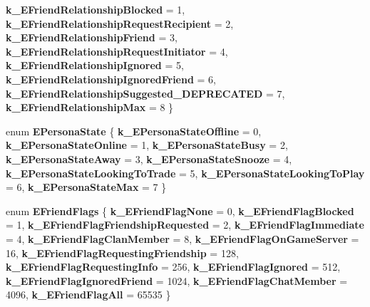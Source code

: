 \begin{DoxyCompactItemize}
{\bfseries k\+\_\+\+E\+Friend\+Relationship\+Blocked} = 1, 
{\bfseries k\+\_\+\+E\+Friend\+Relationship\+Request\+Recipient} = 2, 
{\bfseries k\+\_\+\+E\+Friend\+Relationship\+Friend} = 3, 
\newline
{\bfseries k\+\_\+\+E\+Friend\+Relationship\+Request\+Initiator} = 4, 
{\bfseries k\+\_\+\+E\+Friend\+Relationship\+Ignored} = 5, 
{\bfseries k\+\_\+\+E\+Friend\+Relationship\+Ignored\+Friend} = 6, 
{\bfseries k\+\_\+\+E\+Friend\+Relationship\+Suggested\+\_\+\+D\+E\+P\+R\+E\+C\+A\+T\+ED} = 7, 
\newline
{\bfseries k\+\_\+\+E\+Friend\+Relationship\+Max} = 8
 \}
\item 
\mbox{\label{namespace_valve_1_1_steamworks_a3df615cc7a87f65b8acaf8a15b1a2eaa}} 
enum {\bfseries E\+Persona\+State} \{ \newline
{\bfseries k\+\_\+\+E\+Persona\+State\+Offline} = 0, 
{\bfseries k\+\_\+\+E\+Persona\+State\+Online} = 1, 
{\bfseries k\+\_\+\+E\+Persona\+State\+Busy} = 2, 
{\bfseries k\+\_\+\+E\+Persona\+State\+Away} = 3, 
\newline
{\bfseries k\+\_\+\+E\+Persona\+State\+Snooze} = 4, 
{\bfseries k\+\_\+\+E\+Persona\+State\+Looking\+To\+Trade} = 5, 
{\bfseries k\+\_\+\+E\+Persona\+State\+Looking\+To\+Play} = 6, 
{\bfseries k\+\_\+\+E\+Persona\+State\+Max} = 7
 \}
\item 
\mbox{\label{namespace_valve_1_1_steamworks_a9c974af1f3d523c18bab95f574957c59}} 
enum {\bfseries E\+Friend\+Flags} \{ \newline
{\bfseries k\+\_\+\+E\+Friend\+Flag\+None} = 0, 
{\bfseries k\+\_\+\+E\+Friend\+Flag\+Blocked} = 1, 
{\bfseries k\+\_\+\+E\+Friend\+Flag\+Friendship\+Requested} = 2, 
{\bfseries k\+\_\+\+E\+Friend\+Flag\+Immediate} = 4, 
\newline
{\bfseries k\+\_\+\+E\+Friend\+Flag\+Clan\+Member} = 8, 
{\bfseries k\+\_\+\+E\+Friend\+Flag\+On\+Game\+Server} = 16, 
{\bfseries k\+\_\+\+E\+Friend\+Flag\+Requesting\+Friendship} = 128, 
{\bfseries k\+\_\+\+E\+Friend\+Flag\+Requesting\+Info} = 256, 
\newline
{\bfseries k\+\_\+\+E\+Friend\+Flag\+Ignored} = 512, 
{\bfseries k\+\_\+\+E\+Friend\+Flag\+Ignored\+Friend} = 1024, 
{\bfseries k\+\_\+\+E\+Friend\+Flag\+Chat\+Member} = 4096, 
{\bfseries k\+\_\+\+E\+Friend\+Flag\+All} = 65535
 \}
\item 
\mbox{\label{namespace_valve_1_1_steamworks_a41e12e1765dc7219ace9c49baa95022e}} 

\end{DoxyCompactItemize}
